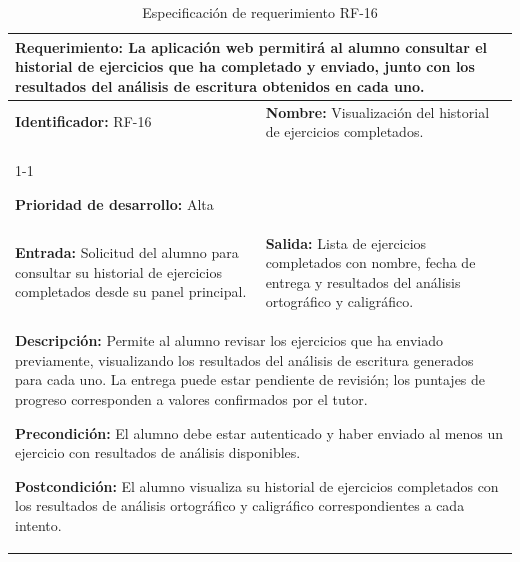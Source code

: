 \begin{longtable}{|p{7cm}|p{8cm}|}
\caption{Especificación de requerimiento RF-16}
\label{tab:rf16} \\ \hline

\multicolumn{2}{|p{15cm}|}{
\textbf{Requerimiento:} La aplicación web permitirá al alumno consultar el historial de ejercicios que ha completado y enviado, junto con los resultados del análisis de escritura obtenidos en cada uno.
} \\ \hline

\textbf{Identificador:} RF-16 &
\textbf{Nombre:} Visualización del historial de ejercicios completados. \\ \cline{1-1}

\textbf{Prioridad de desarrollo:} Alta &
\multicolumn{1}{p{8cm}|}{} \\ \hline

\textbf{Entrada:} Solicitud del alumno para consultar su historial de ejercicios completados desde su panel principal. &
\textbf{Salida:} Lista de ejercicios completados con nombre, fecha de entrega y resultados del análisis ortográfico y caligráfico. \\ \hline

\multicolumn{2}{|p{15cm}|}{
\textbf{Descripción:} Permite al alumno revisar los ejercicios que ha enviado previamente, visualizando los resultados del análisis de escritura generados para cada uno. La entrega puede estar pendiente de revisión; los puntajes de progreso corresponden a valores confirmados por el tutor.

\vspace{0.2cm}

\textbf{Precondición:} El alumno debe estar autenticado y haber enviado al menos un ejercicio con resultados de análisis disponibles.

\vspace{0.2cm}

\textbf{Postcondición:} El alumno visualiza su historial de ejercicios completados con los resultados de análisis ortográfico y caligráfico correspondientes a cada intento.
}
\\ \hline

\end{longtable}

